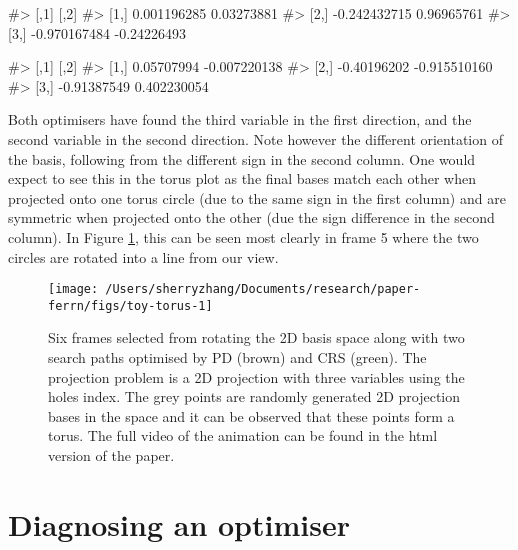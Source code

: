 \begin{Schunk}
\begin{Soutput}
#>              [,1]        [,2]
#> [1,]  0.001196285  0.03273881
#> [2,] -0.242432715  0.96965761
#> [3,] -0.970167484 -0.24226493
\end{Soutput}
\end{Schunk}

\begin{Schunk}
\begin{Soutput}
#>             [,1]         [,2]
#> [1,]  0.05707994 -0.007220138
#> [2,] -0.40196202 -0.915510160
#> [3,] -0.91387549  0.402230054
\end{Soutput}
\end{Schunk}

Both optimisers have found the third variable in the first direction,
and the second variable in the second direction. Note however the
different orientation of the basis, following from the different sign in
the second column. One would expect to see this in the torus plot as the
final bases match each other when projected onto one torus circle (due
to the same sign in the first column) and are symmetric when projected
onto the other (due the sign difference in the second column). In Figure
\ref{fig:toy-torus}, this can be seen most clearly in frame 5 where the
two circles are rotated into a line from our view.

\begin{Schunk}
\begin{figure}

{\centering \texttt{[image: /Users/sherryzhang/Documents/research/paper-ferrn/figs/toy-torus-1]} 

}

\caption[Six frames selected from rotating the 2D basis space along with two search paths optimised by PD (brown) and CRS (green)]{Six frames selected from rotating the 2D basis space along with two search paths optimised by PD (brown) and CRS (green). The projection problem is a 2D projection with three variables using the holes index. The grey points are randomly generated 2D projection bases in the space and it can be observed that these points form a torus. The full video of the animation can be found in the html version of the paper.}\label{fig:toy-torus}
\end{figure}
\end{Schunk}

\hypertarget{application}{%
\section{Diagnosing an optimiser}\label{application}}

